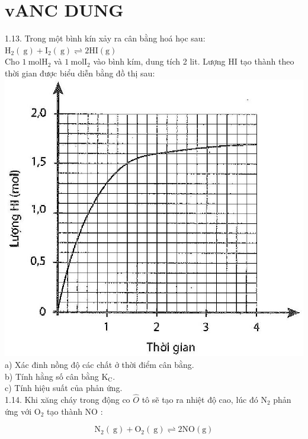 \documentclass[10pt]{article}
\begin{document}
\section*{vANC DUNG}
1.13. Trong một bình kín xảy ra cân bằng hoá học sau:\\
$\mathrm{H}_{2}(\mathrm{~g})+\mathrm{I}_{2}(\mathrm{~g}) \rightleftharpoons 2 \mathrm{HI}(\mathrm{g})$\\
Cho $1 \mathrm{~mol} \mathrm{H}_{2}$ và $1 \mathrm{~mol} \mathrm{I}_{2}$ vào bình kím, dung tích 2 lit. Lượng HI tạo thành theo thời gian được biểu diễn bằng đồ thị sau:\\
\includegraphics[max width=\textwidth, center]{2025_10_23_fa9073eecee116ad8cf2g-04}\\
a) Xác đinh nồng độ các chất ở thời điểm cân bằng.\\
b) Tính hằng số cân bằng $\mathrm{K}_{\mathrm{C}}$.\\
c) Tính hiệu suất của phån ứng.\\
1.14. Khi xăng cháy trong động co $\hat{O}$ tô sẽ tạo ra nhiệt độ cao, lúc đó $\mathrm{N}_{2}$ phản ứng với $\mathrm{O}_{2}$ tạo thành NO :


\begin{equation*}
\mathrm{N}_{2}(\mathrm{~g})+\mathrm{O}_{2}(\mathrm{~g}) \rightleftharpoons 2 \mathrm{NO}(\mathrm{g}) \tag{1}
\end{equation*}
\end{document}
